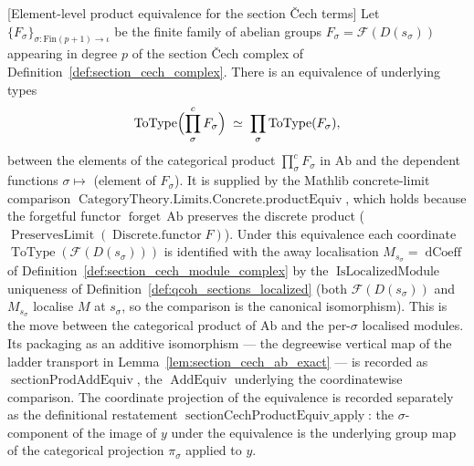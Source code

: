 \begin{lemma}

[Element-level product equivalence for the section {\v C}ech terms]
  \label{lem:section_cech_product_equiv}
  Let \(\{F_\sigma\}_{\sigma : \mathrm{Fin}(p+1) \to \iota}\) be the finite family of
  abelian groups \(F_\sigma = \mathcal{F}(D(s_\sigma))\) appearing in degree \(p\) of
  the section {\v C}ech complex of Definition~\ref{def:section_cech_complex}. There is
  an equivalence of underlying types
  \[
    \operatorname{ToType}\Bigl(\prod^{c}_{\sigma} F_\sigma\Bigr)
    \;\simeq\;
    \prod_{\sigma} \operatorname{ToType}(F_\sigma),
  \]
  between the elements of the categorical product \(\prod^{c}_{\sigma} F_\sigma\) in
  \(\mathrm{Ab}\) and the dependent functions \(\sigma \mapsto\) (element of
  \(F_\sigma\)). It is supplied by the Mathlib concrete-limit comparison
  \(\operatorname{CategoryTheory.Limits.Concrete.productEquiv}\), which holds because the
  forgetful functor \(\operatorname{forget}\,\mathrm{Ab}\) preserves the discrete
  product (\(\operatorname{PreservesLimit}(\operatorname{Discrete.functor} F)\)). Under
  this equivalence each coordinate
  \(\operatorname{ToType}(\mathcal{F}(D(s_\sigma)))\) is identified with the away
  localisation \(M_{s_\sigma} = \operatorname{dCoeff}\) of
  Definition~\ref{def:section_cech_module_complex} by the
  \(\operatorname{IsLocalizedModule}\) uniqueness of
  Definition~\ref{def:qcoh_sections_localized} (both
  \(\mathcal{F}(D(s_\sigma))\) and \(M_{s_\sigma}\) localise \(M\) at \(s_\sigma\), so
  the comparison is the canonical isomorphism). This is the move between the
  categorical product of \(\mathrm{Ab}\) and the per-\(\sigma\) localised modules.
  Its packaging as an additive isomorphism --- the degreewise vertical map of the
  ladder transport in Lemma~\ref{lem:section_cech_ab_exact} --- is recorded as
  \(\operatorname{sectionProdAddEquiv}\), the \(\operatorname{AddEquiv}\) underlying
  the coordinatewise comparison.
  The coordinate projection of the equivalence is recorded separately as the
  definitional restatement
  \(\operatorname{sectionCechProductEquiv\_apply}\): the \(\sigma\)-component of the
  image of \(y\) under the equivalence is the underlying group map of the categorical
  projection \(\pi_\sigma\) applied to \(y\).
\end{lemma}

